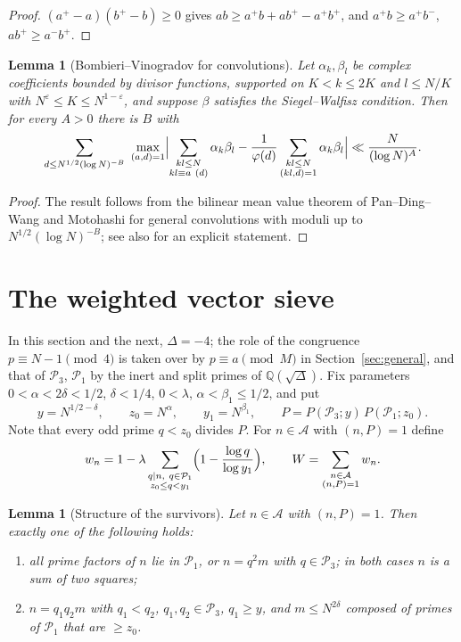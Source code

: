 \documentclass[11pt]{amsart}
\newtheorem{lemma}[theorem]{Lemma}
\theoremstyle{remark}
\newcommand{\cA}{\mathcal{A}}
\newcommand{\cP}{\mathcal{P}}
\begin{document}
\begin{proof}
$(a^+-a)(b^+-b)\ge 0$ gives $ab\ge a^+b+ab^+-a^+b^+$, and $a^+b\ge a^+b^-$, $ab^+\ge a^-b^+$.
\end{proof}

\begin{lemma}[Bombieri--Vinogradov for convolutions]\label{lem:conv}
Let $\alpha_k,\beta_l$ be complex coefficients bounded by divisor functions, supported on
$K<k\le 2K$ and $l\le N/K$ with $N^{\varepsilon}\le K\le N^{1-\varepsilon}$, and suppose $\beta$ satisfies
the Siegel--Walfisz condition. Then for every $A>0$ there is $B$ with
\[
\sum_{d\le N^{1/2}(\log N)^{-B}}\ \max_{(a,d)=1}\Bigl|\sum_{\substack{kl\le N\\ kl\equiv a\ (d)}}\alpha_k\beta_l
-\frac{1}{\varphi(d)}\sum_{\substack{kl\le N\\ (kl,d)=1}}\alpha_k\beta_l\Bigr|\ll\frac{N}{(\log N)^A}.
\]
\end{lemma}

\begin{proof}
The result follows from the bilinear mean value theorem of Pan--Ding--Wang \cite[Lemma~2]{PDW} and
Motohashi \cite[Theorem~1]{Motohashi76} for general convolutions with moduli up to
$N^{1/2}(\log N)^{-B}$; see also \cite[Theorem~0]{BFI} for an explicit statement.
\end{proof}

\section{The weighted vector sieve}\label{sec:weights}

In this section and the next, $\Delta=-4$; the role of the congruence $p\equiv N-1\pmod 4$ is taken over
by $p\equiv a\pmod M$ in Section~\ref{sec:general}, and that of $\cP_3$, $\cP_1$ by the inert and split
primes of $\mathbb Q(\sqrt\Delta)$. Fix parameters $0<\alpha<2\delta<1/2$, $\delta<1/4$, $0<\lambda$, $\alpha<\beta_1\le 1/2$, and put
\[
y=N^{1/2-\delta},\qquad z_0=N^{\alpha},\qquad y_1=N^{\beta_1},\qquad P=P(\cP_3;y)\,P(\cP_1;z_0).
\]
Note that every odd prime $q<z_0$ divides $P$. For $n\in\cA$ with $(n,P)=1$ define
\[
w_n=1-\lambda\sum_{\substack{q\mid n,\ q\in\cP_1\\ z_0\le q<y_1}}\Bigl(1-\frac{\log q}{\log y_1}\Bigr),
\qquad W=\sum_{\substack{n\in\cA\\ (n,P)=1}}w_n .
\]

\begin{lemma}[Structure of the survivors]\label{lem:structure}
Let $n\in\cA$ with $(n,P)=1$. Then exactly one of the following holds:
\begin{enumerate}
\item[(i)] all prime factors of $n$ lie in $\cP_1$, or $n=q^2m$ with $q\in\cP_3$; in both cases $n$ is a
sum of two squares;
\item[(ii)] $n=q_1q_2m$ with $q_1<q_2$, $q_1,q_2\in\cP_3$, $q_1\ge y$, and $m\le N^{2\delta}$ composed of
primes of $\cP_1$ that are $\ge z_0$.
\end{enumerate}
\end{lemma}
\end{document}
